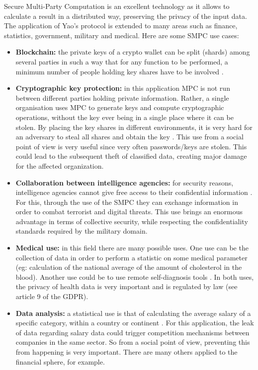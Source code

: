 \documentclass[12pt]{article}
\begin{document}
Secure Multi-Party Computation is an excellent technology as it allows to calculate a result in a distributed way, preserving the privacy of the input data.
The application of Yao's protocol is extended to many areas such as finance, statistics, government, military and medical. Here are some SMPC use cases:
\begin{itemize}

\item \textbf{Blockchain:} the private keys of a crypto wallet can be split (shards) among several parties in such a way that for any function to be performed, a minimum number of people holding key shares have to be involved \cite{Block}.

\item \textbf{Cryptographic key protection:} in this application MPC is not run between different parties holding private information. Rather, a single organisation uses MPC to generate keys and compute cryptographic operations, without the key ever being in a single place where it can be stolen. By placing the key shares in different environments, it is very hard for an adversary to steal all shares and obtain the key \cite{key}. This use from a social point of view is very useful since very often passwords/keys are stolen. This could lead to the subsequent theft of classified data, creating major damage for the affected organization.

\item \textbf{Collaboration between intelligence agencies:} for security reasons, intelligence agencies cannot give free access to their confidential information \cite{int}. For this, through the use of the SMPC they can exchange information in order to combat terrorist and digital threats. This use brings an enormous advantage in terms of collective security, while respecting the confidentiality standards required by the military domain.

\item \textbf{Medical use:} in this field there are many possible uses. One use can be the collection of data in order to perform a statistic on some medical parameter (eg: calculation of the national average of the amount of cholesterol in the blood). Another use could be to use remote self-diagnosis tools \cite{diagn}. In both uses, the privacy of health data is very important and is regulated by law (see article 9 of the GDPR).

\item \textbf{Data analysis:} a statistical use is that of calculating the average salary of a specific category, within a country or continent \cite{salary}. For this application, the leak of data regarding salary data could trigger competition mechanisms between companies in the same sector. So from a social point of view, preventing this from happening is very important. There are many others applied to the financial sphere, for example.


\end{itemize}
\end{document}
